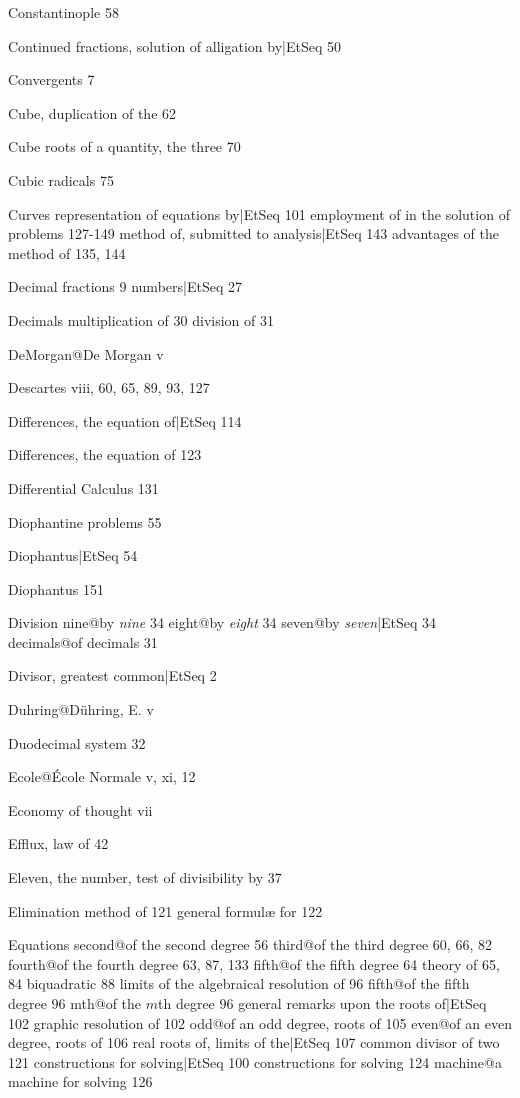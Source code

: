 \documentclass[12pt]{book}[2005/09/16]
\newcommand{\Typo}[2]{#2}
\newcommand{\PageSep}[1]{\ignorespaces}
\begin{document}
Constantinople 58

Continued fractions, solution of alligation by|EtSeq 50 %

Convergents 7

Cube, duplication of the 62

Cube roots of a quantity, the three 70

Cubic radicals 75

Curves
  representation of equations by|EtSeq 101 %
  employment of in the solution of problems 127-149
  method of, submitted to analysis|EtSeq 143 %
  advantages of the method of 135, 144

Decimal
  fractions 9
  numbers|EtSeq 27 %

Decimals
  multiplication of 30
  division of 31
\PageSep{154}

DeMorgan@{\Typo{DeMorgan}{De Morgan}} v

Descartes viii, 60, 65, 89, 93, 127

Differences, the equation of|EtSeq 114 %

Differences, the equation of 123

Differential Calculus 131

Diophantine problems 55

Diophantus|EtSeq 54 %

Diophantus 151

Division
  nine@by \textit{nine} 34
  eight@by \textit{eight} 34
  seven@by \textit{seven}|EtSeq 34 %
  decimals@of decimals 31

Divisor, greatest common|EtSeq 2 %

Duhring@{Dühring, E.} v

Duodecimal system 32

Ecole@{\Typo{Ecole}{École} Normale} v, xi, 12

Economy of thought vii

Efflux, law of 42

Eleven, the number, test of divisibility by 37

Elimination
  method of 121
  general formulæ for 122

Equations
  second@of the second degree 56
  third@of the third degree 60, 66, 82
  fourth@of the fourth degree 63, 87, 133
  fifth@of the fifth degree 64
  theory of 65, 84
  biquadratic 88
  limits of the algebraical resolution of 96
  fifth@of the fifth degree 96
  mth@of the $m$th degree 96
  general remarks upon the roots of|EtSeq 102 %
  graphic resolution of 102
  odd@of an odd degree, roots of 105
  even@of an even degree, roots of 106
  real roots of, limits of the|EtSeq 107 %
  common divisor of two 121
  constructions for solving|EtSeq 100 %
  constructions for solving 124
  machine@a machine for solving 126
\end{document}

